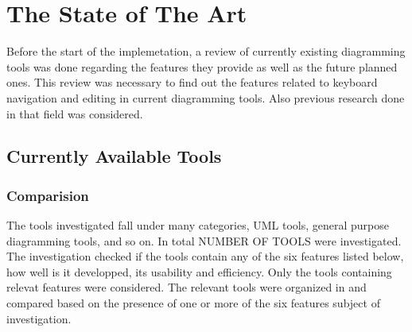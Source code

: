 \chapter{The State of The Art}
\beginchapter
\begin{comment}
=======================================

[there are some stuff that i wrote during the research, i will try to re-use them, it's still not complete]

say that i investigated a number of tools, which type of tools, what was the investigation criteria, state the features that of the comparision criteria, meaning of $+ and -$ and put the table.

each feature, take each tool with + or ++ divide them into categories, compare the tools from the point of view of each feature together.

add conclusion @ the end\\
========================================
\end{comment}

Before the start of the implemetation, a review of currently existing diagramming tools was done regarding the features they provide as well as the future planned ones. This review was necessary to find out the features related to keyboard navigation and editing in current diagramming tools. Also previous research done in that field was considered.

\section{Currently Available Tools}
\subsection{Comparision}
The tools investigated fall under many categories, UML tools, general purpose diagramming tools, and so on. In total NUMBER OF TOOLS were investigated. The investigation checked if the tools contain any of the six features listed below, how well is it developped, its usability and efficiency. Only the tools containing relevat features were considered. The relevant tools were organized in and compared based on the presence of one or more of the six features subject of investigation.

